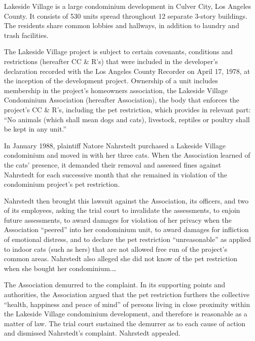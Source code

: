 
Lakeside Village is a large condominium development in Culver City, Los Angeles
County. It consists of 530 units spread throughout 12 separate 3-story
buildings. The residents share common lobbies and hallways, in addition to
laundry and trash facilities.

The Lakeside Village project is subject to certain covenants, conditions and
restrictions (hereafter CC \& R's) that were included in the developer's
declaration recorded with the Los Angeles County Recorder on April 17, 1978, at
the inception of the development project. Ownership of a unit includes
membership in the project's homeowners association, the Lakeside Village
Condominium Association (hereafter Association), the body that enforces the
project's CC \& R's, including the pet restriction, which provides in relevant
part: ``No animals (which shall mean dogs and cats), livestock, reptiles or
poultry shall be kept in any unit.''

In January 1988, plaintiff Natore Nahrstedt purchased a Lakeside Village
condominium and moved in with her three cats. When the Association learned of
the cats' presence, it demanded their removal and assessed fines against
Nahrstedt for each successive month that she remained in violation of the
condominium project's pet restriction.

Nahrstedt then brought this lawsuit against the Association, its officers, and
two of its employees, asking the trial court to invalidate the assessments, to
enjoin future assessments, to award damages for violation of her privacy when
the Association ``peered'' into her condominium unit, to award damages for
infliction of emotional distress, and to declare the pet restriction
``unreasonable'' as applied to indoor cats (such as hers) that are not allowed
free run of the project's common areas. Nahrstedt also alleged she did not know
of the pet restriction when she bought her condominium.\ldots 

The Association demurred to the complaint. In its supporting points and
authorities, the Association argued that the pet restriction furthers the
collective ``health, happiness and peace of mind'' of persons living in close
proximity within the Lakeside Village condominium development, and therefore is
reasonable as a matter of law. The trial court sustained the demurrer as to each
cause of action and dismissed Nahrstedt's complaint. Nahrstedt appealed.

